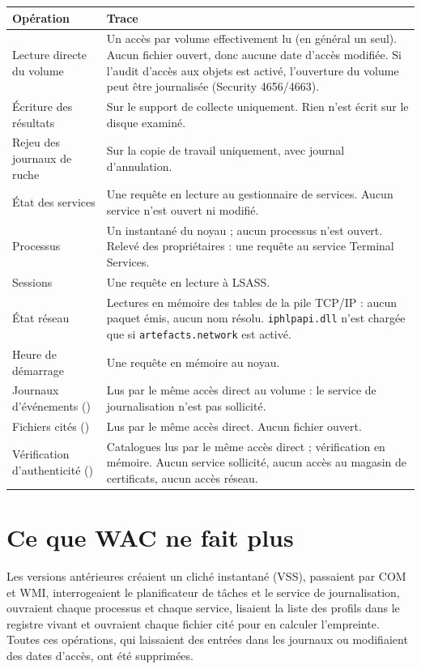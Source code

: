 \documentclass[11pt,a4paper,oneside]{report}
\begin{document}
\begin{longtable}{@{}L{4.3cm}L{10.1cm}@{}}
\toprule
\bfseries Opération & \bfseries Trace \\
\midrule
\endhead
Lecture directe du volume & Un accès par volume effectivement lu (en général un
  seul). Aucun fichier ouvert, donc aucune date d'accès modifiée. Si l'audit
  d'accès aux objets est activé, l'ouverture du volume peut être journalisée
  (Security 4656/4663). \\
Écriture des résultats & Sur le support de collecte uniquement. Rien n'est écrit
  sur le disque examiné. \\
Rejeu des journaux de ruche & Sur la copie de travail uniquement, avec journal
  d'annulation. \\
État des services & Une requête en lecture au gestionnaire de services. Aucun
  service n'est ouvert ni modifié. \\
Processus & Un instantané du noyau ; aucun processus n'est ouvert. Relevé des
  propriétaires : une requête au service Terminal Services. \\
Sessions & Une requête en lecture à LSASS. \\
État réseau & Lectures en mémoire des tables de la pile TCP/IP : aucun paquet
  émis, aucun nom résolu. \texttt{iphlpapi.dll} n'est chargée que si
  \texttt{artefacts.network} est activé. \\
Heure de démarrage & Une requête en mémoire au noyau. \\
Journaux d'événements () & Lus par le même accès direct au volume :
  le service de journalisation n'est pas sollicité. \\
Fichiers cités () & Lus par le même accès direct. Aucun fichier
  ouvert. \\
Vérification d'authenticité () & Catalogues lus par le même accès
  direct ; vérification en mémoire. Aucun service sollicité, aucun accès au
  magasin de certificats, aucun accès réseau. \\
\bottomrule
\end{longtable}

\section{Ce que WAC ne fait plus}

Les versions antérieures créaient un cliché instantané (VSS), passaient par COM et
WMI, interrogeaient le planificateur de tâches et le service de journalisation,
ouvraient chaque processus et chaque service, lisaient la liste des profils dans
le registre vivant et ouvraient chaque fichier cité pour en calculer
l'empreinte. Toutes ces opérations, qui laissaient des entrées dans les journaux
ou modifiaient des dates d'accès, ont été supprimées.
\end{document}
